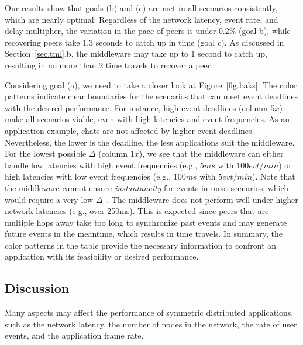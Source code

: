 \documentclass[10pt,journal,compsoc]{IEEEtran}
\begin{document}

Our results show that goals (b) and (c) are met in all scenarios consistently,
which are nearly optimal:
Regardless of the network latency, event rate, and delay multiplier,
    the variation in the pace of peers is under $0.2\%$ (goal b), while
    recovering peers take $1.3$ seconds to catch up in time (goal c).
As discussed in Section~\ref{sec.tml}.b, the middleware may take up to $1$
second to catch up, resulting in no more than 2 time travels to recover a peer.

Considering goal (a), we need to take a closer look at Figure~\ref{fig.baks}.
The color patterns indicate clear boundaries for the scenarios that can meet
event deadlines with the desired performance.
%
For instance, high event deadlines (column $5x$) make all scenarios viable,
even with high latencies and event frequencies.
As an application example, chats are not affected by higher event deadlines.
Nevertheless, the lower is the deadline, the less applications suit the
middleware.
%
For the lowest possible $\Delta$ (column $1x$), we see that the middleware can
either handle low latencies with high event frequencies (e.g., $5ms$ with
$100evt/min$) or high latencies with low event frequencies (e.g., $100ms$ with
$5evt/min$).
Note that the middleware cannot ensure \emph{instantaneity} for events in most
scenarios, which would require a very low $\Delta$~\cite{melding}.
%
The middleware does not perform well under higher network latencies (e.g., over
250ms).
This is expected since peers that are multiple hops away take too long to
synchronize past events and may generate future events in the meantime, which
results in time travels.
%
In summary, the color patterns in the table provide the necessary information
to confront an application with its feasibility or desired performance.

\subsection{Discussion}

Many aspects may affect the performance of symmetric distributed applications,
such as
    the network latency,
    the number of nodes in the network,
    the rate of user events,
    and the application frame rate.
\end{document}
